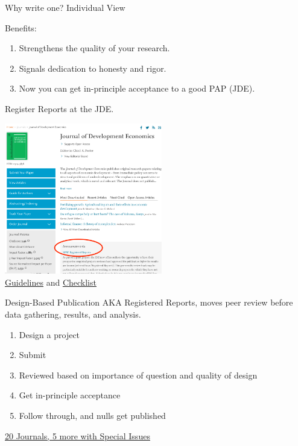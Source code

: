 \documentclass{beamer}
\begin{document}
\begin{frame}{Why write one? Individual View }

Benefits:\\
\begin{enumerate}
\item Strengthens the quality of your research.
\item Signals dedication to honesty and rigor.
\item Now you can get in-principle acceptance to a good PAP (JDE).

\end{enumerate}


\end{frame}

\begin{frame}{Register Reports at the JDE.}

\includegraphics[height=2.6in]{../Images/RR.png}\\
\href{https://www.elsevier.com/__data/promis_misc/JDE_RR_Author_Guidelines.pdf}{Guidelines}
and
\href{https://docs.google.com/spreadsheets/d/1zhG3AxOJIB7H1m4-S0jwMN1cQKNVsLomsxktEDVrbP8/edit\#gid=1835444640}{Checklist}

\end{frame}

\begin{frame}{Design-Based Publication}
AKA Registered Reports, moves peer review before data gathering, results, and analysis.

\begin{enumerate}[<.->]
\item Design a project
\item Submit
\item Reviewed based on importance of question and quality of design
\item Get in-principle acceptance
\item Follow through, and nulls get published
\end{enumerate}
\href{https://osf.io/8mpji/wiki/home/}{20 Journals, 5 more with Special Issues }
\end{frame}
\end{document}
